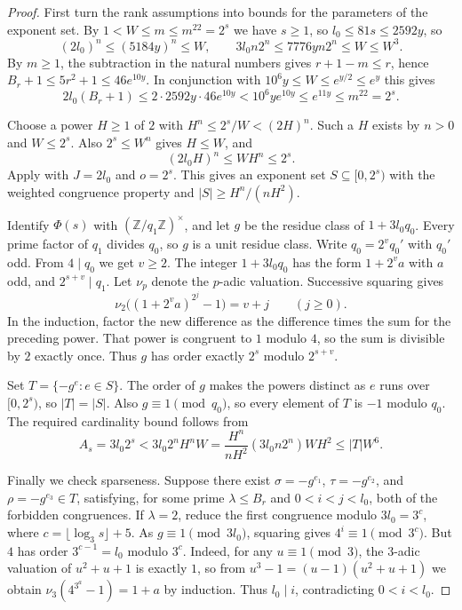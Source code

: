 \begin{proof}
First turn the rank assumptions into bounds for the parameters of the exponent set. By $1<W\le m\le m^{22}=2^s$ we have $s\ge1$, so
$l_0\le81s\le2592y$, so
\[
 (2l_0)^n\le(5184y)^n\le W,\qquad
 3l_0 n2^n\le7776yn2^n\le W\le W^3 .
\]
By $m\ge1$, the subtraction in the natural numbers gives $r+1-m\le r$, hence
$B_r+1\le 5r^2+1\le46 e^{10y}$.
In conjunction with $10^6y\le W\le e^{y/2}\le e^y$ this gives
\[
 2l_0(B_r+1)
 \le 2\cdot2592y\cdot46e^{10y}
 <10^6y e^{10y}\le e^{11y}\le m^{22}=2^s .
\]

Choose a power $H\ge1$ of $2$ with $H^n\le2^s/W<(2H)^n$. Such a $H$ exists by $n>0$ and $W\le2^s$.
Also $2^s\le W^n$ gives $H\le W$, and
\[
 (2l_0H)^n\le WH^n\le2^s.
\]
Apply  with $J=2l_0$ and $o=2^s$. This gives an exponent set $S\subseteq[0,2^s)$ with the weighted congruence property and $|S|\ge H^n/(nH^2)$.

Identify $\Phi(s)$ with $(\mathbb Z/q_1\mathbb Z)^\times$, and let $g$ be the residue class of $1+3l_0q_0$. Every prime factor of $q_1$ divides $q_0$, so $g$ is a unit residue class.
Write $q_0=2^v q_0'$ with $q_0'$ odd. From $4\mid q_0$ we get $v\ge2$. The integer $1+3l_0q_0$ has the form $1+2^v a$ with $a$ odd, and $2^{s+v}\mid q_1$.
Let $\nu_p$ denote the $p$-adic valuation. Successive squaring gives
\[
 \nu_2\bigl((1+2^v a)^{2^j}-1\bigr)=v+j\qquad(j\ge0).
\]
In the induction, factor the new difference as the difference times the sum for the preceding power. That power is congruent to $1$ modulo $4$, so the sum is divisible by $2$ exactly once. Thus $g$ has order exactly $2^s$ modulo $2^{s+v}$.

Set $T=\{-g^e:e\in S\}$. The order of $g$ makes the powers distinct as $e$ runs over $[0,2^s)$, so $|T|=|S|$. Also $g\equiv1\pmod{q_0}$, so every element of $T$ is $-1$ modulo $q_0$. The required cardinality bound follows from
\[
 A_s=3l_0 2^s
 <3l_0 2^n H^n W
 =\frac{H^n}{nH^2}(3l_0 n2^n)W H^2
 \le |T| W^6 .
\]

Finally we check sparseness. Suppose there exist $\sigma=-g^{e_1}$, $\tau=-g^{e_2}$, and $\rho=-g^{e_3}\in T$, satisfying, for some prime
$\lambda\le B_r$ and $0<i<j<l_0$, both of the forbidden congruences. If $\lambda=2$, reduce the first congruence modulo
$3l_0=3^c$, where $c=\lfloor\log_3 s\rfloor+5$. As $g\equiv1\pmod{3l_0}$, squaring gives $4^i\equiv1\pmod{3^c}$.
But $4$ has order $3^{c-1}=l_0$ modulo $3^c$. Indeed, for any $u\equiv1\pmod3$, the $3$-adic valuation of $u^2+u+1$ is exactly $1$, so from
$u^3-1=(u-1)(u^2+u+1)$ we obtain $\nu_3(4^{3^a}-1)=1+a$ by induction. Thus $l_0\mid i$, contradicting $0<i<l_0$.


\end{proof}
